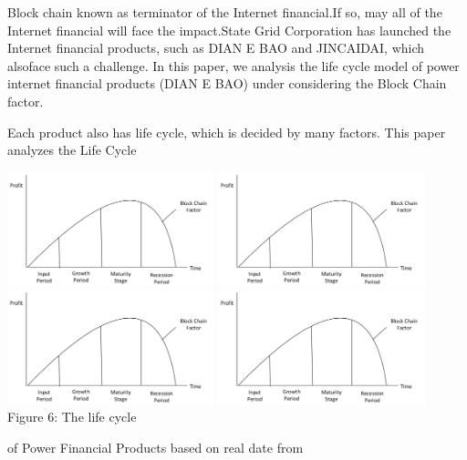 \documentclass[11pt]{article}
\begin{document}
\begin{multicols}{2}
	Block chain known as terminator of the Internet
	financial.If so, may all of the Internet financial
	will face the impact.State Grid Corporation has
	launched the Internet financial products, such as
	DIAN E BAO and JINCAIDAI, which alsoface such
	a challenge. In this paper, we analysis the life cycle
	model of power internet financial products (DIAN E
	BAO) under considering the Block Chain factor.
	
	Each product also has life cycle, which is decided
	by many factors. This paper analyzes the Life Cycle
	\end{multicols}\begin{center}
	\includegraphics*[width=0.45\textwidth]{block_chain.png}
	\includegraphics*[width=0.45\textwidth]{block_chain.png}\\
	\noindent
	\includegraphics*[width=0.45\textwidth]{block_chain.png}
	\includegraphics*[width=0.45\textwidth]{block_chain.png}\\ \noindent Figure 6: The life cycle
\end{center}\begin{multicols}{2}
		of Power Financial Products based on real date from

\end{multicols}
\end{document}
